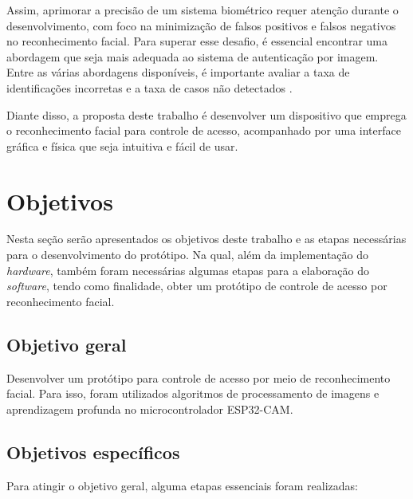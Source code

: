 Assim, aprimorar a precisão de um sistema biométrico requer atenção 
durante o desenvolvimento, com foco na minimização de falsos 
positivos e falsos negativos no reconhecimento facial. Para superar esse 
desafio, é essencial encontrar uma abordagem que seja mais adequada ao 
sistema de autenticação por imagem. Entre as várias abordagens disponíveis, 
é importante avaliar a taxa de identificações incorretas e a taxa de 
casos não detectados \cite{viola2004}.


Diante disso, a proposta deste trabalho é desenvolver um dispositivo que emprega 
o reconhecimento facial para controle de acesso, acompanhado por 
uma interface gráfica e física que seja intuitiva e fácil de usar.

\section{Objetivos}\label{sec:objetivos}

Nesta seção serão apresentados os objetivos deste trabalho e as etapas necessárias 
para o desenvolvimento do protótipo. Na qual, além da implementação do 
\textit{hardware}, também foram necessárias algumas etapas para a elaboração do \textit{software}, 
tendo como finalidade, obter um protótipo de controle de acesso por 
reconhecimento facial.

\subsection{Objetivo geral}\label{subsec:objetivoGeral}

Desenvolver um protótipo para controle de acesso por meio de reconhecimento facial. 
Para isso, foram utilizados algoritmos de processamento de imagens e aprendizagem 
profunda no microcontrolador ESP32-CAM.

\subsection{Objetivos específicos}\label{subsec:objetivosEspecificos}

Para atingir o objetivo geral, alguma etapas essenciais foram realizadas:

